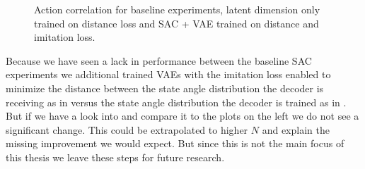\begin{figure}[h]
    \begin{center}
        \hfill
    \end{center}
    \caption[action correlation comparison]{Action correlation for baseline experiments, latent dimension only trained on distance loss and SAC + VAE trained on distance and imitation loss. }
    \label{fig:SAC_action_correlation_comp}
\end{figure}

Because we have seen a lack in performance between the baseline SAC experiments we additional trained VAEs with the imitation loss enabled to minimize the distance between the state angle distribution the decoder is receiving as in  versus the state angle distribution the decoder is trained as in . But if we have a look into  and compare it to the plots on the left we do not see a significant change. This could be extrapolated to higher $N$ and explain the missing improvement we would expect. But since this is not the main focus of this thesis we leave these steps for future research.

